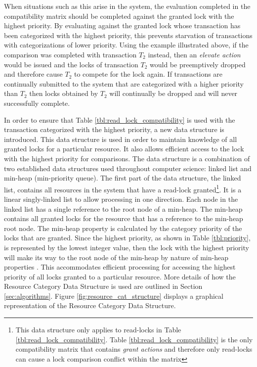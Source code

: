 \documentclass[conference]{IEEEtran}
\begin{document}
When situations such as this arise in the system, the evaluation completed in the compatibility matrix should be completed against the granted lock with the highest priority. By evaluating against the granted lock whose transaction has been categorized with the highest priority, this prevents starvation of transactions with categorizations of lower priority. Using the example illustrated above, if the comparison was completed with transaction $T_{2}$ instead, then an \textit{elevate action} would be issued and the locks of transaction $T_{2}$ would be preemptively dropped and therefore cause $T_{2}$ to compete for the lock again. If transactions are continually submitted to the system that are categorized with a higher priority than $T_{2}$ then locks obtained by $T_{2}$ will continually be dropped and will never successfully complete.

In order to ensure that Table \ref{tbl:read_lock_compatibility} is used with the transaction categorized with the highest priority, a new data structure is introduced. This data structure is used in order to maintain knowledge of all granted locks for a particular resource. It also allows efficient access to the lock with the highest priority for comparisons. The data structure is a combination of two established data structures used throughout computer science: linked list and min-heap (min-priority queue). The first part of the data structure, the linked list, contains all resources in the system that have a read-lock granted\footnote{This data structure only applies to read-locks in Table \ref{tbl:read_lock_compatibility}. Table \ref{tbl:read_lock_compatibility} is the only compatibility matrix that contains \textit{grant actions} and therefore only read-locks can cause a lock comparison conflict within the matrix}. It is a linear singly-linked list to allow processing in one direction. Each node in the linked list has a single reference to the root node of a min-heap. The min-heap contains all granted locks for the resource that has a reference to the min-heap root node. The min-heap property is calculated by the category priority of the locks that are granted. Since the highest priority, as shown in Table \ref{tbl:priority}, is represented by the lowest integer value, then the lock with the highest priority will make its way to the root node of the min-heap by nature of min-heap properties \cite[p.162]{Cormen_Algorithms}. This accommodates efficient processing for accessing the highest priority of all locks granted to a particular resource. More details of how the Resource Category Data Structure is used are outlined in Section \ref{sec:algorithms}. Figure \ref{fig:resource_cat_structure} displays a graphical representation of the Resource Category Data Structure.
\end{document}
